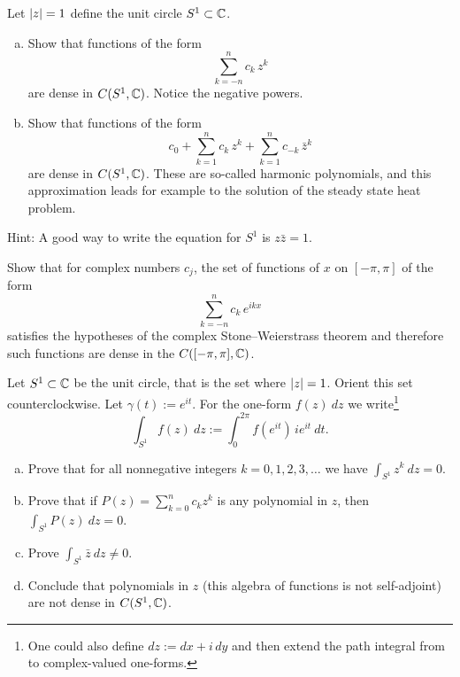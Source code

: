 \pagebreak[2]
\begin{exercise}
Let $\lvert {z} \rvert=1$ define the unit circle $S^1 \subset {\mathbb{C}}$.
\begin{enumerate}[a)]
\item
Show that functions of the form
\begin{equation*}
\sum_{k=-n}^n c_k\, z^k
\end{equation*}
are dense in $C(S^1,{\mathbb{C}})$.  Notice the negative powers.
\item 
Show that functions of the form
\begin{equation*}
c_0
+
\sum_{k=1}^n c_k \, z^k
+
\sum_{k=1}^n c_{-k}\, \bar{z}^k
\end{equation*}
are dense in $C(S^1,{\mathbb{C}})$.  These are so-called harmonic polynomials,
and this approximation leads for example to the solution of the
steady state heat problem.
\end{enumerate}
Hint: A good way to write the equation for $S^1$ is $z \bar{z} = 1$.
\end{exercise}

\pagebreak[1]
\begin{exercise}
Show that for complex numbers $c_j$, the set of functions
of $x$ on $[-\pi,\pi]$
of the form
\begin{equation*}
\sum_{k=-n}^n c_k \, e^{ik x}
\end{equation*}
satisfies the hypotheses of the complex Stone--Weierstrass theorem
and therefore such functions are dense in the $C([-\pi,\pi],{\mathbb{C}})$.
\end{exercise}


\begin{exercise} \label{exercise:selfadjointSW}
Let $S^1 \subset {\mathbb{C}}$ be the unit circle, that is the set where
$\lvert {z} \rvert = 1$.  Orient this set counterclockwise.
Let $\gamma(t) := e^{it}$.
For the one-form $f(z)~dz$ we write\footnote{%
One could also define $dz := dx + i \, dy$ and then
extend the path integral from  to complex-valued
one-forms.}
\begin{equation*}
\int_{S^1} f(z) ~dz := \int_0^{2\pi} f(e^{it}) \, i e^{it} ~ dt . 
\end{equation*}
\begin{enumerate}[a)]
\item
Prove that for all nonnegative integers $k = 0,1,2,3,\ldots$ we have
$\int_{S^1} z^k ~ dz = 0$.
\item
Prove that if
$P(z) = \sum_{k=0}^n c_k z^k$ is any
polynomial in $z$, then
$\int_{S^1} P(z) ~ dz = 0$.
\item
Prove
$\int_{S^1} \bar{z} ~ dz \not= 0$.
\item
Conclude that polynomials in $z$ (this algebra of functions is
not self-adjoint) are not dense in $C(S^1,{\mathbb{C}})$.
\end{enumerate}
\end{exercise}

